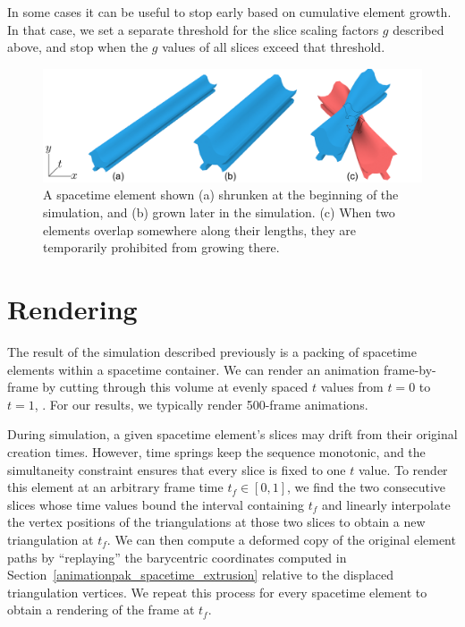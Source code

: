 In some cases it can be useful to stop early based on cumulative element
growth.  In that case, we set a separate threshold for the slice scaling
factors $g$ described above, and stop when the $g$ values of all
slices exceed that threshold.

\begin{figure}
\centering
\includegraphics[width=1.0\textwidth]{figures/animationpak/growth.pdf} 
\caption[Element growths]
{\label{fig_animationpak_growth} 
A spacetime element shown (a) shrunken at the beginning of the simulation,
and (b) grown later in the simulation. (c) When two elements overlap
somewhere along their lengths, they are temporarily prohibited from growing
there.
}
\end{figure}


\section{Rendering}
\label{animationpak_rendering}



The result of the simulation described previously is a packing of spacetime 
elements within a spacetime container.  We can render an
animation frame-by-frame by cutting through this volume at 
evenly spaced $t$ values from $t=0$ to $t=1$, .  For our results, we
typically render 500-frame animations.


During simulation, a given spacetime element's slices may drift from their
original creation times.  However, time springs keep the sequence
monotonic, and the simultaneity constraint ensures that every slice
is fixed to one $t$ value.  To render this element at an arbitrary
frame time $t_f\in[0,1]$, we find the two consecutive slices whose
time values
bound the interval containing $t_f$ and linearly interpolate the vertex
positions of the triangulations at those two slices to obtain a new
triangulation at $t_f$.  We can then compute a deformed copy of the
original element paths by ``replaying'' the barycentric coordinates 
computed in Section~\ref{animationpak_spacetime_extrusion} relative to the displaced
triangulation vertices.  We repeat this process for every spacetime element
to obtain a rendering of the frame at $t_f$.

